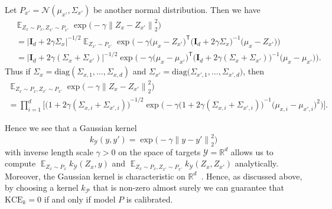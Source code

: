 \documentclass{article}
\DeclareMathOperator{\Exp}{\mathbb{E}}
\begin{document}
Let $P_{x'} = \mathcal{N}(\mu_{x'}, \Sigma_{x'})$ be another
normal distribution. Then we have
\begin{equation*}
    \begin{split}
        &\Exp_{Z_x \sim P_x, Z_{x'} \sim P_{x'}} \exp{\Big(- \gamma {\|Z_x - Z_{x'}\|}^2_2\Big)} \\
        &\, = \big|\mathbf{I}_{d} + 2\gamma \Sigma_x\big|^{-1/2} \Exp_{Z_{x'} \sim P_{x'}} \exp{\Big(-\gamma {\big(\mu_x - Z_{x'}\big)}^\mathsf{T} {\big(\mathbf{I}_{d} + 2\gamma \Sigma_x\big)}^{-1} {\big(\mu_x - Z_{x'}\big)}\Big)} \\
        &\, = \big|\mathbf{I}_{d} + 2\gamma (\Sigma_x + \Sigma_{x'})\big|^{-1/2} \exp{\Big(-\gamma {\big(\mu_x - \mu_{x'}\big)}^\mathsf{T} {\big(\mathbf{I}_{d} + 2\gamma(\Sigma_x + \Sigma_{x'})\big)}^{-1} {\big(\mu_x - \mu_{x'}\big)}\Big)}.
    \end{split}
\end{equation*}
Thus if $\Sigma_x = \mathrm{diag}{(\Sigma_{x,1}, \ldots, \Sigma_{x,d})}$
and $\Sigma_{x'} = \mathrm{diag}{\big(\Sigma_{x',1}, \ldots, \Sigma_{x',d}\big)}$, then
\begin{multline*}
    \Exp_{Z_x \sim P_x, Z_{x'} \sim P_{x'}} \exp{\Big(- \gamma {\|Z_x - Z_{x'}\|}^2_2\Big)} \\
    = \prod_{i=1}^{d} \bigg[{\big(1 + 2\gamma (\Sigma_{x,i} + \Sigma_{x',i})\big)}^{-1/2} \exp{\Big(-\gamma{\big(1 + 2\gamma(\Sigma_{x,i} + \Sigma_{x',i})\big)}^{-1} {\big(\mu_{x,i} - \mu_{x',i}\big)}^2 \Big)} \bigg].
\end{multline*}

Hence we see that a Gaussian kernel
\begin{equation*}
    k_{\mathcal{Y}}(y, y') = \exp{\big(-\gamma {\|y - y'\|}_2^2\big)}
\end{equation*}
with inverse length scale $\gamma > 0$ on the space of
targets $\mathcal{Y} = \mathbb{R}^d$
allows us to compute $\Exp_{Z_x \sim P_x} k_{\mathcal{Y}}(Z_x, y)$ and
$\Exp_{Z_x \sim P_x, Z_{x'} \sim P_{x'}} k_{\mathcal{Y}}(Z_x, Z_{x'})$
analytically. Moreover, the Gaussian kernel is characteristic on
$\mathbb{R}^d$~\citep{Fukumizu2008}. Hence, as discussed above,
by choosing a kernel $k_{\mathcal{P}}$ that is non-zero almost surely we can
guarantee that $\mathrm{KCE}_k = 0$ if and only if model $P$ is
calibrated.
\end{document}
